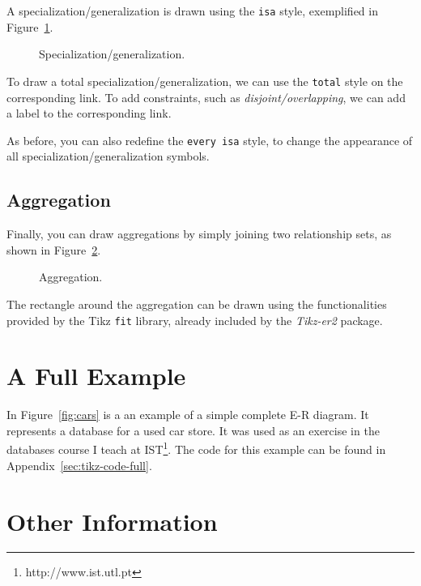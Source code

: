 \documentclass[12pt]{article}
\newcommand{\demo}[1]{
  \bigskip
  \begin{minipage}{\linewidth}
      \begin{center}
          
      \end{center}
      \begin{center}
          
      \end{center}
  \end{minipage}
}
\begin{document}
A specialization/generalization is drawn using the \texttt{isa} style,
exemplified in Figure~\ref{fig:isa}.

\begin{figure}[htb!]
    \centering
    \demo{isa}
    \caption{Specialization/generalization.}
\label{fig:isa}
\end{figure}

To draw a total specialization/generalization, we can use the \texttt{total}
style on the corresponding link.  To add constraints, such as
\emph{disjoint/overlapping}, we can add a label to the corresponding link.

As before, you can also redefine the \texttt{every isa} style, to change the
appearance of all specialization/generalization symbols.

\subsection{Aggregation}
\label{sec:aggregation}

Finally, you can draw aggregations by simply joining two relationship sets, as
shown in Figure~\ref{fig:aggregation}.

\begin{figure}[htb!]
    \centering
    \demo{aggregation}
    \caption{Aggregation.}
    \label{fig:aggregation}
\end{figure}

The rectangle around the aggregation can be drawn using the functionalities
provided by the Tikz \texttt{fit} library, already included by the
\emph{Tikz-er2} package.

\section{A Full Example}
\label{sec:full-example}

In Figure~\ref{fig:cars} is a an example of a simple complete E-R diagram. It
represents a database for a used car store. It was used as an exercise in the
databases course I teach at IST\footnote{http://www.ist.utl.pt}. The code for
this example can be found in Appendix~\ref{sec:tikz-code-full}.

\begin{sidewaysfigure}[p!]
    
    \caption{E-R diagram for a used car store database.}
\label{fig:cars}
\end{sidewaysfigure}

\section{Other Information}
\label{sec:other-information}
\end{document}
